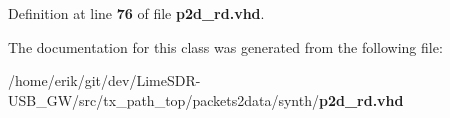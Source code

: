 Definition at line {\bf 76} of file {\bf p2d\+\_\+rd.\+vhd}.



The documentation for this class was generated from the following file\+:\begin{DoxyCompactItemize}
\item 
/home/erik/git/dev/\+Lime\+S\+D\+R-\/\+U\+S\+B\+\_\+\+G\+W/src/tx\+\_\+path\+\_\+top/packets2data/synth/{\bf p2d\+\_\+rd.\+vhd}\end{DoxyCompactItemize}
